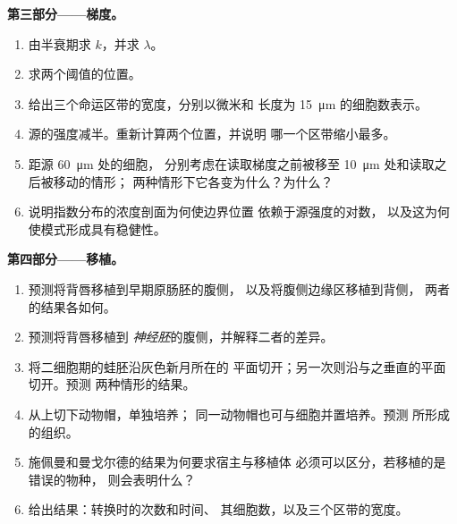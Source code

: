 \begin{problem}
\medskip
\noindent\textbf{第三部分——梯度。}
\begin{enumerate}[resume]
  \item 由半衰期求 $k$，并求 $\lambda$。
  \item 求两个阈值的位置。
  \item 给出三个命运区带的宽度，分别以微米和
        长度为 \qty{15}{\micro m} 的细胞数表示。
  \item 源的强度减半。重新计算两个位置，并说明
        哪一个区带缩小最多。
  \item 距源 \qty{60}{\micro m} 处的细胞，
        分别考虑在读取梯度之前被移至 \qty{10}{\micro m} 处和读取之后被移动的情形；
        两种情形下它各变为什么？为什么？
  \item 说明指数分布的浓度剖面为何使边界位置
        依赖于源强度的对数，
        以及这为何使模式形成具有稳健性。
\end{enumerate}

\medskip
\noindent\textbf{第四部分——移植。}
\begin{enumerate}[resume]
  \item 预测将背唇移植到早期原肠胚的腹侧，
        以及将腹侧边缘区移植到背侧，
        两者的结果各如何。
  \item 预测将背唇移植到
        \emph{神经胚}的腹侧，并解释二者的差异。
  \item 将二细胞期的蛙胚沿灰色新月所在的
        平面切开；另一次则沿与之垂直的平面切开。预测
        两种情形的结果。
  \item 从上切下动物帽，单独培养；
        同一动物帽也可与细胞并置培养。预测
        所形成的组织。
  \item 施佩曼和曼戈尔德的结果为何要求宿主与移植体
        必须可以区分，若移植的是错误的物种，
        则会表明什么？
  \item 给出结果：转换时的次数和时间、
        其细胞数，以及三个区带的宽度。
\end{enumerate}
\end{problem}
